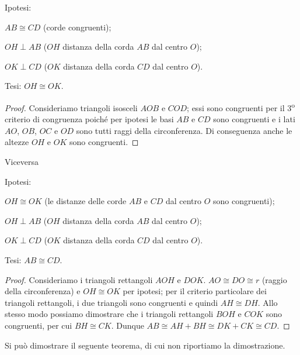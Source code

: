 \noindent\begin{minipage}{0.65\textwidth}\parindent15pt
\noindent Ipotesi:
\begin{itemize*}
\item $AB\cong CD$ (corde congruenti);
\item $OH\perp AB$ ($OH$ distanza della corda $AB$ dal centro $O$);
\item $OK\perp CD$ ($OK$ distanza della corda $CD$ dal centro $O$).
\end{itemize*}
\noindent Tesi: $OH\cong OK$.

\begin{proof}
Consideriamo triangoli isosceli $AOB$ e $COD$; essi sono congruenti 
per il 3\textsuperscript{o} criterio di congruenza poiché per ipotesi 
le basi $AB$ e $CD$ sono congruenti e i lati $AO$, $OB$, $OC$ e $OD$ 
sono tutti raggi della circonferenza.
Di conseguenza anche le altezze $OH$ e $OK$ sono congruenti.
\end{proof}
\end{minipage}\hfil
\begin{minipage}{0.35\textwidth}
  \centering
\end{minipage}\vspace{8pt}

\noindent Viceversa\vspace{5pt}

\noindent Ipotesi:
\begin{itemize*}
\item $OH\cong OK$ (le distanze delle corde $AB$ e $CD$ dal centro 
$O$ sono congruenti);
\item $OH\perp AB$ ($OH$ distanza della corda $AB$ dal centro $O$);
\item $OK\perp CD$ ($OK$ distanza della corda $CD$ dal centro $O$).
\end{itemize*}
\noindent Tesi: $AB\cong CD$.

\begin{proof}
Consideriamo i triangoli rettangoli $AOH$ e $DOK$. $AO\cong DO\cong 
r$ (raggio della circonferenza) e $OH\cong OK$ per ipotesi; per il 
criterio particolare dei triangoli rettangoli, i due triangoli sono 
congruenti e quindi $AH\cong DH$. Allo stesso modo possiamo 
dimostrare che i triangoli rettangoli $BOH$ e $COK$ sono congruenti, 
per cui $BH\cong CK$. Dunque $AB \cong AH + BH \cong DK + CK \cong 
CD$.
\end{proof}

Si può dimostrare il seguente teorema, di cui non riportiamo la dimostrazione.

